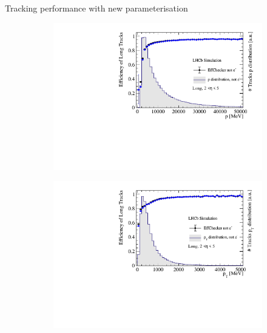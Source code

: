 \documentclass[xcolor={dvipsnames}]{beamer}
\begin{document}
\begin{frame}{Tracking performance with new parameterisation}
  \vspace{0.0cm}
  \begin{figure}[htb]
    \centering
    \begin{subfigure}{0.45\textwidth}
      \includegraphics[width=1\textwidth]{Plots/TrackEfficiency_p_bad_MC_parameterisation.pdf}
    \end{subfigure}%
    \begin{subfigure}{0.45\textwidth}
      \includegraphics[width=1\textwidth]{Plots/TrackEfficiency_pt_bad_MC_parameterisation.pdf}
    \end{subfigure}
    \begin{subfigure}{0.45\textwidth}

\end{subfigure}
\end{figure}
\end{frame}
\end{document}
